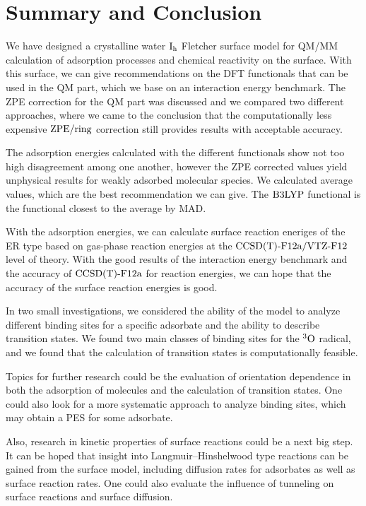 \section{Summary and Conclusion}
\label{Sec:Con}
We have designed a crystalline water $\text I_\text h$ Fletcher surface model for QM/MM
calculation of adsorption processes and chemical reactivity on the surface. With
this surface, we can give recommendations on the DFT functionals that can be
used in the QM part, which we base on an interaction energy benchmark. The ZPE
correction for the QM part was discussed and we compared two different
approaches, where we came to the conclusion that the computationally less
expensive $\text{ZPE}/\text{ring}$ correction still provides results with acceptable
accuracy.

The adsorption energies calculated with the different functionals show not too
high disagreement among one another, however the ZPE corrected values yield
unphysical results for weakly adsorbed molecular species. We calculated average
values, which are the best recommendation we can give. The $\text{B3LYP}$ functional
is the functional closest to the average by MAD.

With the adsorption energies, we can calculate surface reaction eneriges of the
ER type based on gas-phase reaction energies at the $\text{CCSD(T)-F12a}/\text{VTZ-F}12$ level of
theory. With the good results of the interaction energy benchmark and the
accuracy of $\text{CCSD(T)-F12a}$ for reaction energies, we can hope that the accuracy of
the surface reaction energies is good.

In two small investigations, we considered the
ability of the model to analyze different binding sites for a specific adsorbate
and the ability to describe transition states. We found two main classes of
binding sites for the ${^3\text{O}}$ radical, and we found that the calculation of
transition states is computationally feasible.

Topics for further research could be the evaluation of orientation dependence
in both the adsorption of molecules and the calculation of transition states.
One could also look for a more systematic approach to analyze binding sites,
which may obtain a PES for some adsorbate.

Also, research in kinetic properties of surface reactions could be a next big
step. It can be hoped that insight into Langmuir--Hinshelwood type reactions can
be gained from the surface model, including diffusion rates for adsorbates as
well as surface reaction rates. One could also evaluate the influence of
tunneling on surface reactions and surface diffusion.

